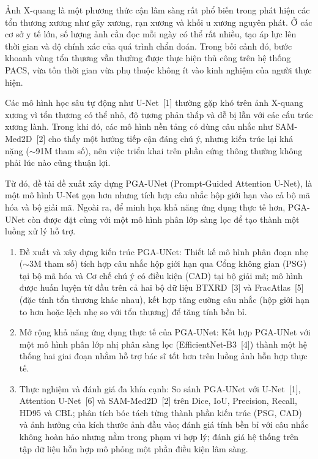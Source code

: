 \pagebreak


\medskip
{}

\medskip
Ảnh X-quang là một phương thức cận lâm sàng rất phổ biến trong phát hiện các tổn thương xương như gãy xương, rạn xương và khối u xương nguyên phát. Ở các cơ sở y tế lớn, số lượng ảnh cần đọc mỗi ngày có thể rất nhiều, tạo áp lực lên thời gian và độ chính xác của quá trình chẩn đoán. Trong bối cảnh đó, bước khoanh vùng tổn thương vẫn thường được thực hiện thủ công trên hệ thống PACS, vừa tốn thời gian vừa phụ thuộc không ít vào kinh nghiệm của người thực hiện.

Các mô hình học sâu tự động như U-Net~[1] thường gặp khó trên ảnh X-quang xương vì tổn thương có thể nhỏ, độ tương phản thấp và dễ bị lẫn với các cấu trúc xương lành. Trong khi đó, các mô hình nền tảng có dùng câu nhắc như SAM-Med2D~[2] cho thấy một hướng tiếp cận đáng chú ý, nhưng kiến trúc lại khá nặng ($\sim$91M tham số), nên việc triển khai trên phần cứng thông thường không phải lúc nào cũng thuận lợi.

Từ đó, đề tài đề xuất xây dựng PGA-UNet (Prompt-Guided Attention U-Net), là một mô hình U-Net gọn hơn nhưng tích hợp câu nhắc hộp giới hạn vào cả bộ mã hóa và bộ giải mã. Ngoài ra, để minh họa khả năng ứng dụng thực tế hơn, PGA-UNet còn được đặt cùng với một mô hình phân lớp sàng lọc để tạo thành một luồng xử lý hỗ trợ.

\medskip
{}

\medskip
\begin{enumerate}
    \item Đề xuất và xây dựng kiến trúc PGA-UNet: Thiết kế mô hình phân đoạn nhẹ ($\sim$3M tham số) tích hợp câu nhắc hộp giới hạn qua Cổng không gian (PSG) tại bộ mã hóa và Cơ chế chú ý có điều kiện (CAD) tại bộ giải mã; mô hình được huấn luyện từ đầu trên cả hai bộ dữ liệu BTXRD~[3] và FracAtlas~[5] (đặc tính tổn thương khác nhau), kết hợp tăng cường câu nhắc (hộp giới hạn to hơn hoặc lệch nhẹ so với tổn thương) để tăng tính bền bỉ.

    \item Mở rộng khả năng ứng dụng thực tế của PGA-UNet: Kết hợp PGA-UNet với một mô hình phân lớp nhị phân sàng lọc (EfficientNet-B3~[4]) thành một hệ thống hai giai đoạn nhằm hỗ trợ bác sĩ tốt hơn trên luồng ảnh hỗn hợp thực tế.

    \item Thực nghiệm và đánh giá đa khía cạnh: So sánh PGA-UNet với U-Net~[1], Attention U-Net~[6] và SAM-Med2D~[2] trên Dice, IoU, Precision, Recall, HD95 và CBL; phân tích bóc tách từng thành phần kiến trúc (PSG, CAD) và ảnh hưởng của kích thước ảnh đầu vào; đánh giá tính bền bỉ với câu nhắc không hoàn hảo nhưng nằm trong phạm vi hợp lý; đánh giá hệ thống trên tập dữ liệu hỗn hợp mô phỏng một phần điều kiện lâm sàng.
\end{enumerate}

